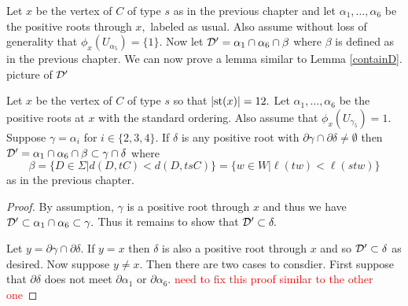 \documentclass[class=book, crop=false]{standalone}
\begin{document}
Let $x$ be the vertex of $C$ of type $s$ as in the previous chapter and let $\alpha_1,\dots,\alpha_6$ be the positive roots through $x,$ labeled as usual. Also assume without loss of generality that $\phi_x(U_{\alpha_5})=\{1\}.$ Now let $\mathcal{D}'=\alpha_1\cap \alpha_6\cap \beta$ where $\beta$ is defined as in the previous chapter. We can now prove a lemma similar to Lemma \ref{containD}.\\
\Huge picture of $\mathcal{D}'$\normalsize\\

\begin{lemma}
	\label{336f2containD}
	Let $x$ be the vertex of $C$ of type $s$ so that $|\mathrm{st}(x)|=12.$ Let $\alpha_1,\dots,\alpha_6$ be the positive roots at $x$ with the standard ordering. Also assume that $\phi_x(U_{\gamma_5})=1.$ Suppose $\gamma=\alpha_i$ for $i\in \{2,3,4\}.$ If $\delta$ is any positive root with $\partial\gamma\cap \partial\delta\neq \emptyset$ then $\mathcal{D}'=\alpha_1\cap \alpha_6\cap \beta\subset \gamma\cap \delta$ where 
	\[
	\beta=\{D\in \Sigma|d(D,tC)<d(D,tsC)\}=\{w\in W|\ell(tw)<\ell(stw)\}
	\]
	as in the previous chapter.
\end{lemma}
\begin{proof}
	By assumption, $\gamma$ is a positive root through $x$ and thus we have $\mathcal{D}'\subset \alpha_1\cap \alpha_6\subset \gamma.$ Thus it remains to show that $\mathcal{D}'\subset \delta.$

	Let $y=\partial\gamma\cap \partial\delta.$ If $y=x$ then $\delta$ is also a positive root through $x$ and so $\mathcal{D}'\subset \delta$ as desired. Now suppose $y\neq x.$ Then there are two cases to consdier. First suppose that $\partial \delta$ does not meet $\partial\alpha_1$ or $\partial\alpha_6.$ \textcolor{red}{need to fix this proof similar to the other one}

\end{proof}
%
%
\end{document}
